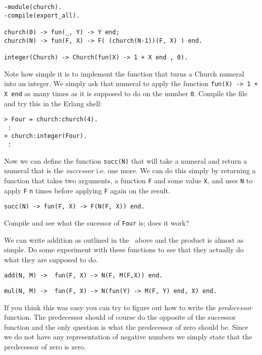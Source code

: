 \documentclass[a4paper,11pt]{article}
\begin{document}
\begin{verbatim}
-module(church).
-compile(export_all).

church(0) -> fun(_, Y) -> Y end;
church(N) -> fun(F, X) -> F( (church(N-1))(F, X) ) end.

integer(Church) -> Church(fun(X) -> 1 + X end , 0).
\end{verbatim}

Note how simple it is to implement the function that turns a Church
numeral into an integer. We simply ask that numeral to apply the
function {\tt fun(X) -> 1 + X end} as many times as it is supposed to
do on the number {\tt 0}. Compile the file and try this in the Erlang shell:

\begin{verbatim}
> Four = church:church(4).
 :
> church:integer(Four).
 :
\end{verbatim}


Now we can define the function {\tt succ(N)} that will take a numeral
and return a numeral that is the {\em successor} i.e. one more. We
can do this simply by returning a function that takes two arguments, a
function {\tt F} and some value {\tt X}, and uses {\tt N} to apply {\tt F}
{\tt n} times before applying {\tt F} again on the result. 

\begin{verbatim}
succ(N) -> fun(F, X) -> F(N(F, X)) end.
\end{verbatim}

Compile and see what the sucessor of {\tt Four} is; does it work?

We can write addition as outlined in the \lame\ above and the product
is almost as simple. Do some experiment with these functions to see
that they actually do what they are supposed to do.

\begin{verbatim}
add(N, M) ->  fun(F, X) -> N(F, M(F,X)) end.
\end{verbatim}
\begin{verbatim}
mul(N, M) ->  fun(F, X) -> N(fun(Y) -> M(F, Y) end, X) end.
\end{verbatim}

If you think this was easy you can try to figure out how to write the
{\em predecessor} function. The predecessor should of course do the
opposite of the successor function and the only question is what the
predecessor of zero should be. Since we do not have any
representation of negative numbers we simply state that the
predecessor of zero is zero.
\end{document}
